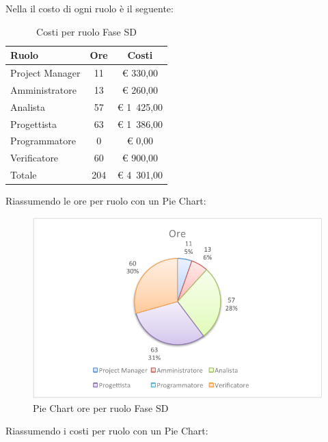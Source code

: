 				Nella  il costo di ogni ruolo è il seguente:
				\begin{table}[H]
					\begin{center}
						\begin{tabular}{| l | c | c |}
							\hline
							Ruolo 				& Ore 	& Costi  \\ \hline
							
							Project Manager		& 11 		& \euro{} 330,00 	\\
							Amministratore 		& 13 		& \euro{} 260,00 	\\
							Analista	 		& 57 		& \euro{} 1~425,00 	\\
							Progettista 		& 63 		& \euro{} 1~386,00  	\\
							Programmatore		& 0			& \euro{} 0,00	\\
							Verificatore		& 60 		& \euro{} 900,00 	\\ \hline \hline
								
							Totale	 			& 204 		& \euro{} 4~301,00 	\\ \hline
						\end{tabular}
					\end{center}
					\caption{Costi per ruolo Fase SD}
				\end{table}
				Riassumendo le ore per ruolo con un Pie Chart:
				\begin{figure}[H]\centering
					\includegraphics[width=\textwidth]{PianoDiProgetto/Pics/ChartTotOreFaseSD.pdf}
					\caption{Pie Chart ore per ruolo Fase SD}
				\end{figure}
				Riassumendo i costi per ruolo con un Pie Chart:
